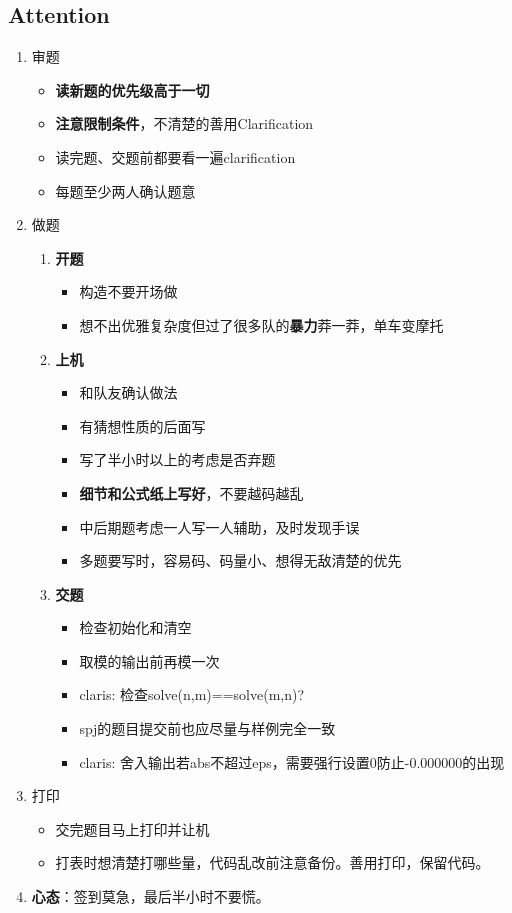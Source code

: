 \subsection{Attention}
  \begin{enumerate}
    \item 审题
      \begin{itemize}
        \item \textbf{读新题的优先级高于一切}
        \item \textbf{注意限制条件}，不清楚的善用Clarification
        \item 读完题、交题前都要看一遍clarification
        \item 每题至少两人确认题意
      \end{itemize}
    \item 做题
      \begin{enumerate}
        \item \textbf{开题}
          \begin{itemize}
            \item 构造不要开场做
            \item 想不出优雅复杂度但过了很多队的\textbf{暴力}莽一莽，单车变摩托

          \end{itemize}
        \item \textbf{上机}
          \begin{itemize}
            \item 和队友确认做法
            \item 有猜想性质的后面写
            \item 写了半小时以上的考虑是否弃题
            \item \textbf{细节和公式纸上写好}，不要越码越乱
            \item 中后期题考虑一人写一人辅助，及时发现手误
            \item 多题要写时，容易码、码量小、想得无敌清楚的优先
          \end{itemize}
        \item \textbf{交题}
          \begin{itemize}
            \item 检查初始化和清空
            \item 取模的输出前再模一次
            \item claris: 检查solve(n,m)==solve(m,n)?
            \item spj的题目提交前也应尽量与样例完全一致
            \item claris: 舍入输出若abs不超过eps，需要强行设置0防止-0.000000的出现
          \end{itemize}
      \end{enumerate}
    \item 打印
      \begin{itemize}
        \item 交完题目马上打印并让机
        \item 打表时想清楚打哪些量，代码乱改前注意备份。善用打印，保留代码。
      \end{itemize}
    \item \textbf{心态}：签到莫急，最后半小时不要慌。
  \end{enumerate}

